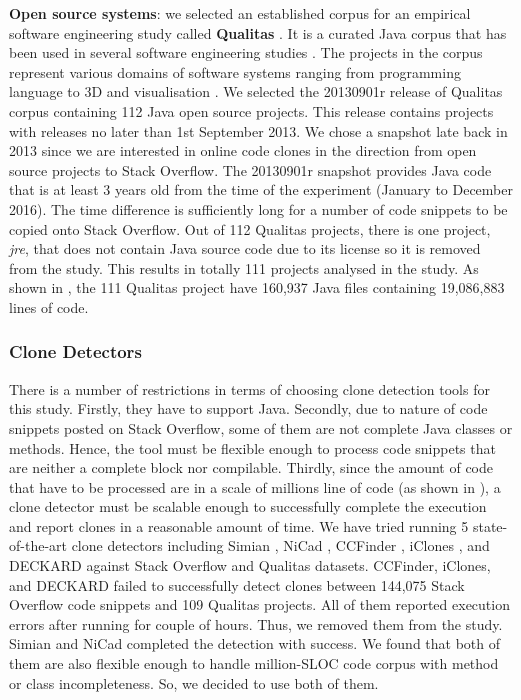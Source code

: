 \documentclass{sig-alternate-05-2015}
\begin{document}
\textbf{Open source systems}: we selected an established corpus for an empirical software engineering study called \textbf{Qualitas} \cite{QualitasCorpus}. It is a curated Java corpus that has been used in several software engineering studies \cite{Taube-Schock2011,Beckman2011,Vasilescu2011,Omar2012}. The projects in the corpus represent various domains of software systems ranging from programming language to 3D and visualisation \cite{QualitasCorpus}. We selected the 20130901r release of Qualitas corpus containing 112 Java open source projects. This release contains projects with releases no later than 1st September 2013. We chose a snapshot late back in 2013 since we are interested in online code clones in the direction from open source projects to Stack Overflow. The 20130901r snapshot provides Java code that is at least 3 years old from the time of the experiment (January to December 2016). The time difference is sufficiently long for a number of code snippets to be copied onto Stack Overflow. Out of 112 Qualitas projects, there is one project, \textit{jre}, that does not contain Java source code due to its license \cite{QualitasCorpus} so it is removed from the study. This results in totally 111 projects analysed in the study. As shown in , the 111 Qualitas project have 160,937 Java files containing 19,086,883 lines of code. %

\subsubsection{Clone Detectors}
There is a number of restrictions in terms of choosing clone detection tools for this study. Firstly, they have to support Java. Secondly, due to nature of code snippets posted on Stack Overflow, some of them are not complete Java classes or methods. Hence, the tool must be flexible enough to process code snippets that are neither a complete block nor compilable. Thirdly, since the amount of code that have to be processed are in a scale of millions line of code (as shown in ), a clone detector must be scalable enough to successfully complete the execution and report clones in a reasonable amount of time. We have tried running 5 state-of-the-art clone detectors including Simian \cite{simian}, NiCad \cite{Cordy,Roy2008}, CCFinder \cite{Kamiya2002}, iClones \cite{Gode2009}, and DECKARD \cite{Jiang2007a} against Stack Overflow and Qualitas datasets. CCFinder, iClones, and DECKARD failed to successfully detect clones between 144,075 Stack Overflow code snippets and 109 Qualitas projects. All of them reported execution errors after running for couple of hours. Thus, we removed them from the study. Simian and NiCad completed the detection with success. We found that both of them are also flexible enough to handle million-SLOC code corpus with method or class incompleteness. So, we decided to use both of them.
\end{document}
